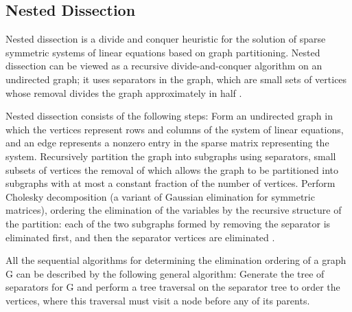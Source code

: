\subsection{Nested Dissection}

Nested dissection is a divide and conquer heuristic for the solution of sparse symmetric systems of linear equations based on graph partitioning. Nested dissection can be viewed as a recursive divide-and-conquer algorithm on an undirected graph; it uses separators in the graph, which are small sets of vertices whose removal divides the graph approximately in half  \cite{lipton_generalized_1979}.

Nested dissection consists of the following steps: Form an undirected graph in which the vertices represent rows and columns of the system of linear equations, and an edge represents a nonzero entry in the sparse matrix representing the system. Recursively partition the graph into subgraphs using separators, small subsets of vertices the removal of which allows the graph to be partitioned into subgraphs with at most a constant fraction of the number of vertices. Perform Cholesky decomposition (a variant of Gaussian elimination for symmetric matrices), ordering the elimination of the variables by the recursive structure of the partition: each of the two subgraphs formed by removing the separator is eliminated first, and then the separator vertices are eliminated \cite{george_nested_1973}. 

All the sequential algorithms for determining the elimination ordering of a graph G can be described by the following general algorithm: Generate the tree of separators for G and perform a tree traversal on the separator tree to order the vertices, where this traversal must visit a node before any of its parents.
